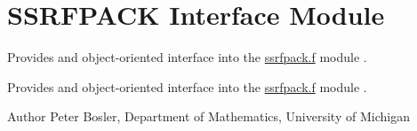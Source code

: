 \hypertarget{group__SSRFPACKInterface}{\section{S\+S\+R\+F\+P\+A\+C\+K Interface Module}
\label{group__SSRFPACKInterface}
}


Provides and object-\/oriented interface into the \hyperlink{ssrfpack_8f}{ssrfpack.\+f} module \cite{SSRFPACK} .  


Provides and object-\/oriented interface into the \hyperlink{ssrfpack_8f}{ssrfpack.\+f} module \cite{SSRFPACK} . 

\begin{DoxyAuthor}{Author}
Peter Bosler, Department of Mathematics, University of Michigan 
\end{DoxyAuthor}
